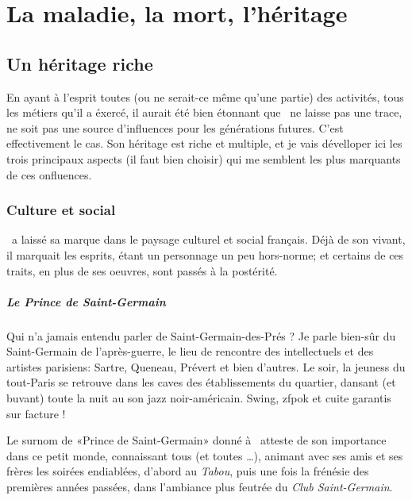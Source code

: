 \chapter{La maladie, la mort, l'héritage}

\section{Un héritage riche}

En ayant à l'esprit toutes (ou ne serait-ce même qu'une partie) des activités,
tous les métiers qu'il a éxercé, il aurait été bien étonnant que \BV\ ne
laisse pas une trace, ne soit pas une source d'influences pour les générations
futures.
C'est effectivement le cas. Son héritage est riche et multiple, et je vais
dévelloper ici les trois principaux aspects (il faut bien choisir) qui me semblent
les plus marquants de ces onfluences.

\subsection{Culture et social}

\BV\ a laissé sa marque dans le paysage culturel et social français. Déjà
de son vivant, il marquait les esprits, étant un personnage un peu hors-norme; et
certains de ces traits, en plus de ses oeuvres, sont passés à la postérité.

\paragraph{Le Prince de Saint-Germain}

Qui n'a jamais entendu parler de Saint-Germain-des-Prés ? Je parle bien-sûr
du Saint-Germain de l'après-guerre, le lieu de rencontre des intellectuels et
des artistes parisiens: Sartre, Queneau, Prévert %
et bien d'autres. Le soir, la jeuness du tout-Paris se retrouve dans les caves
des établissements du quartier, dansant (et buvant) toute la nuit au son jazz
noir-américain. Swing, zfpok et cuite garantis sur facture !

Le surnom de «Prince de Saint-Germain» donné à \BV\ atteste de son importance
dans ce petit monde, connaissant tous (et toutes \ldots), animant avec ses amis et
ses frères les soirées endiablées, d'abord au \emph{Tabou}, puis une fois la
frénésie des premières années passées, dans l'ambiance plus feutrée du \emph{Club
Saint-Germain}.

